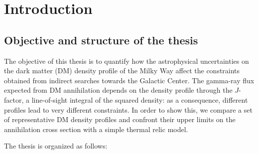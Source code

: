 \chapter*{Introduction}

\section*{Objective and structure of the thesis}


The objective of this thesis is to quantify how the astrophysical uncertainties 
on the dark matter (DM) density profile of the Milky Way affect the constraints obtained from 
indirect searches towards the Galactic Center. 
The gamma-ray flux expected from DM annihilation depends 
on the density profile through the $J$-factor, a line-of-sight integral of the squared density: as a consequence, different profiles lead to very different constraints.
In order to show this, we compare a set of representative DM density profiles and confront their upper limits on the annihilation cross section with a simple thermal relic model.

The thesis is organized as follows:

